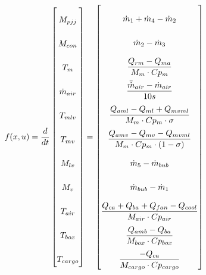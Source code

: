 \begin{equation} \label{eq:f_noSub} \renewcommand{\arraystretch}{2.4}
	f(x,u) =  \dfrac{d}{dt} \begin{bmatrix}
		M_{pjj}			\\				%
		M_{con} 		\\				%
		T_m 			\\				%
		\dot{m}_{air}	\\				%
		T_{mlv}			\\				%
		T_{mv}			\\				%
		M_{lv}			\\				%
		M_v				\\				%
		T_{air}			\\				%
		T_{box}			\\				%
		T_{cargo}		\\				%

	\end{bmatrix}
	=
	\begin{bmatrix}
		\dot{m}_1 + \dot{m}_4 - \dot{m}_2 \\										%
		\dot{m}_{2} - \dot{m}_{3}	\\												%
		\dfrac{Q_{rm} - Q_{ma}}{M_m \cdot Cp_m} \\									%
		\dfrac{\bar{\dot{m}}_{air}  - \dot{m}_{air}} {10s}		\\					%
		\dfrac{Q_{aml}-Q_{ml} + Q_{mvml}}{M_m \cdot Cp_m \cdot \sigma}        \\	%
		\dfrac{Q_{amv} - Q_{mv} - Q_{mvml}}{M_m \cdot Cp_m \cdot (1- \sigma)}	\\	%
		\dot{m}_{5} - \dot{m}_{bub}		\\											%
		\dot{m}_{bub} - \dot{m}_{1}	\\												%
		\dfrac{Q_{ca} + Q_{ba} + Q_{fan} -Q_{cool}}{M_{air} \cdot Cp_{air}} \\		%
		\dfrac{Q_{amb} - Q_{ba}}{M_{box} \cdot Cp_{box}} \\							%
		\dfrac{-Q_{ca}}{M_{cargo} \cdot Cp_{cargo}}									%
	\end{bmatrix}
\end{equation}






